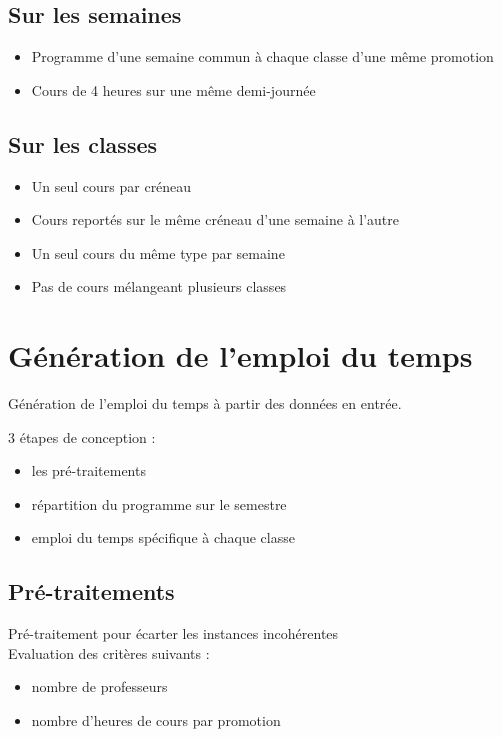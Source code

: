 \documentclass{beamer}
\begin{document}
\subsection{Sur les semaines}
\begin{frame}
\begin{itemize}
\item Programme d'une semaine commun à chaque classe d'une même promotion
\item Cours de 4 heures sur une même demi-journée
\end{itemize}
\end{frame}

\subsection{Sur les classes}
\begin{frame}
\begin{itemize}
\item Un seul cours par créneau
\item Cours reportés sur le même créneau d'une semaine à l'autre
\item Un seul cours du même type par semaine
\item Pas de cours mélangeant plusieurs classes
\end{itemize}
\end{frame}



\section{Génération de l'emploi du temps}
\begin {frame}
Génération de l'emploi du temps à partir des données en entrée.

3 étapes de conception : 
\begin{itemize}
\item les pré-traitements
\item répartition du programme sur le semestre
\item emploi du temps spécifique à chaque classe
\end{itemize}
\end{frame}

\subsection{Pré-traitements}
\begin{frame}
Pré-traitement pour écarter les instances incohérentes\\
\vspace{\baselineskip}
Evaluation des critères suivants :
\begin {itemize}
\item nombre de professeurs
\item nombre d'heures de cours par promotion
\end{itemize}
\end{frame}
\end{document}
